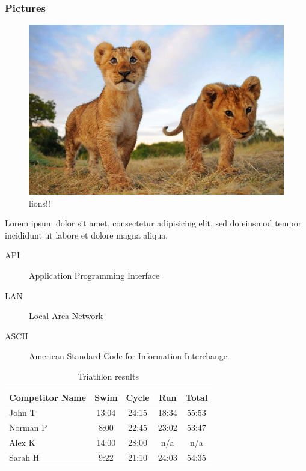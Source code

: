 \documentclass[14pt]{beamer}
\begin{document}
\begin{frame}
\frametitle{Pictures}
\begin{figure}
	\includegraphics[scale=0.1]{Lion}
	\caption{lions!!}
\end{figure}
	Lorem ipsum dolor sit amet, consectetur adipisicing elit, sed do eiusmod tempor incididunt ut labore et dolore magna aliqua.
\end{frame}

\begin{frame}
\begin{description}
	\item[API] Application Programming Interface
	\item[LAN] Local Area Network
	\item[ASCII] American Standard Code for Information Interchange
\end{description}
\end{frame}

\begin{frame}
\begin{table}
	\begin{tabular}{l | c | c | c | c }
		Competitor Name & Swim & Cycle & Run & Total \\
		\hline \hline
		John T & 13:04 & 24:15 & 18:34 & 55:53 \\
		Norman P & 8:00 & 22:45 & 23:02 & 53:47\\
		Alex K & 14:00 & 28:00 & n/a & n/a\\
		Sarah H & 9:22 & 21:10 & 24:03 & 54:35
	\end{tabular}
	\caption{Triathlon results}
\end{table}
\end{frame}
\end{document}
